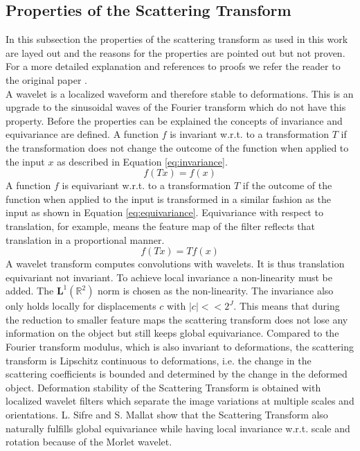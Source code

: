 \subsection{Properties of the Scattering Transform}
\label{subsec:properties}


In this subsection the properties of the scattering transform as used in this work are layed out and the reasons for the properties are pointed out but not proven. For a more detailed explanation and references to proofs we refer the reader to the original paper \cite{scatteringTransform2012}. \\
A wavelet is a localized waveform and therefore stable to deformations. This is an upgrade to the sinusoidal waves of the Fourier transform which do not have this property. Before the properties can be explained the concepts of invariance and equivariance are defined. 
A function $f$ is invariant w.r.t. to a transformation $T$ if the transformation does not change the outcome of the function when applied to the input $x$ as described in Equation \ref{eq:invariance}.
\begin{equation}
f(Tx) = f(x)
\label{eq:invariance}
\end{equation}
A function $f$ is equivariant w.r.t. to a transformation $T$ if the outcome of the function when applied to the input is transformed in a similar fashion as the input as shown in Equation \ref{eq:equivariance}. Equivariance with respect to translation, for example, means the feature map of the filter reflects that translation in a proportional manner.
\begin{equation}
f(Tx) = Tf(x)
\label{eq:equivariance}
\end{equation}
A wavelet transform computes convolutions with wavelets. It is thus translation equivariant not invariant. To achieve local invariance a non-linearity must be added. The $\textbf{L}^1(\mathbb{R}^2)$ norm is chosen as the non-linearity. 
The invariance also only holds locally for displacements $c$ with $|c| << 2^J$. This means that during the reduction to smaller feature maps the scattering transform does not lose any information on the object but still keeps global equivariance. Compared to the Fourier transform modulus, which is also invariant to deformations, the scattering transform is Lipschitz continuous to deformations, i.e. the change in the scattering coefficients is bounded and determined by the change in the deformed object. Deformation  stability of the Scattering Transform is  obtained  with  localized wavelet filters which separate the image variations at multiple scales and orientations. L. Sifre and S. Mallat  \cite{RotationScalingDeformationSifre2013} show that the Scattering Transform also naturally fulfills global equivariance while having local invariance w.r.t. scale and rotation because of the Morlet wavelet.

